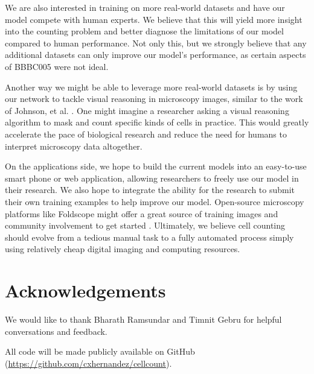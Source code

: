 \documentclass[10pt,twocolumn,letterpaper]{article}
\begin{document}
We are also interested in training on more real-world datasets and have our model compete with human experts.
We believe that this will yield more insight into the counting problem and better diagnose the limitations of our model compared to human performance.
Not only this, but we strongly believe that any additional datasets can only improve our model's performance, as certain aspects of BBBC005 were not ideal.

Another way we might be able to leverage more real-world datasets is by using our network to tackle visual reasoning in microscopy images,
similar to the work of Johnson, et al. \cite{visreas}. One might imagine a researcher asking a visual reasoning algorithm to mask and count
specific kinds of cells in practice. This would greatly accelerate the pace of biological research and reduce the need for humans to interpret
microscopy data altogether.

On the applications side, we hope to build the current models into an easy-to-use smart phone or web application, allowing researchers to freely use our model in their research.
We also hope to integrate the ability for the research to submit their own training examples to help improve our model.
Open-source microscopy platforms like Foldscope might offer a great source of training images and community involvement to get started \cite{foldscope}.
Ultimately, we believe cell counting should evolve from a tedious manual task to a fully automated process simply using relatively cheap digital imaging and computing resources. 

\section{Acknowledgements}
We would like to thank Bharath Ramsundar and Timnit Gebru for helpful conversations and feedback.

All code will be made publicly available on GitHub
(\href{https://github.com/cxhernandez/cellcount}{https://github.com/cxhernandez/cellcount}).

{\small


}
\end{document}
